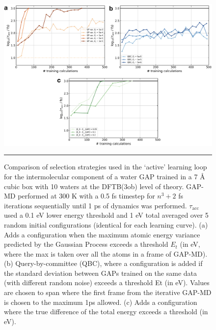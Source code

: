 \documentclass[../../main.tex]{subfiles}
\newcommand{\taua}{$\tau_\text{acc}$ }
\begin{document}
\begin{figure}[h!]
	\vspace{0.4cm}
	\centering
	\includegraphics[width=\textwidth]{6/gap/figs_si/fig25}
	\vspace{0.2cm}
	\hrule
	\caption{Comparison of selection strategies used in the ‘active’ learning loop for the intermolecular component of a water GAP trained in a 7 \AA$\;$cubic box with 10 waters at the DFTB(3ob) level of theory. GAP-MD performed at 300 K with a 0.5 fs timestep for $n^3+2$ fs iterations sequentially until 1 ps of dynamics was performed. \taua used a 0.1 eV lower energy threshold and 1 eV total averaged over 5 random initial configurations (identical for each learning curve). (a) Adds a configuration when the maximum atomic energy variance predicted by the Gaussian Process exceeds a threshold $E_t$ (in eV, where the max is taken over all the atoms in a frame of GAP-MD). (b) Query-by-committee (QBC), where a configuration is added if the standard deviation between GAPs trained on the same data (with different random noise) exceeds a threshold Et (in eV). Values are chosen to span where the first frame from the iterative GAP-MD is chosen to the maximum 1ps allowed. (c) Adds a configuration where the true difference of the total energy exceeds a threshold (in eV).}
	\label{fig::ml_si_25}
\end{figure}








\clearpage
\end{document}
